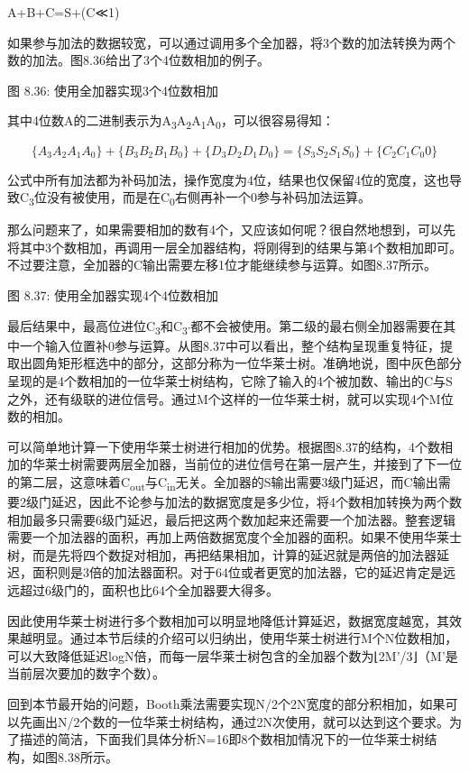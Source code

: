 \documentclass[]{ctexbook}
\begin{document}
A+B+C=S+(C≪1)

如果参与加法的数据较宽，可以通过调用多个全加器，将3个数的加法转换为两个数的加法。图8.36给出了3个4位数相加的例子。

图 8.36: 使用全加器实现3个4位数相加

其中4位数A的二进制表示为A\textsubscript{3}A\textsubscript{2}A\textsubscript{1}A\textsubscript{0}，可以很容易得知：

\[\{A_{3}A_{2}A_{1}A_{0}\}+\{B_{3}B_{2}B_{1}B_{0}\}+\{D_{3}D_{2}D_{1}D_{0}\}=\{S_{3}S_{2}S_{1}S_{0}\}+\{C_{2}C_{1}C_{0}0\}\]

公式中所有加法都为补码加法，操作宽度为4位，结果也仅保留4位的宽度，这也导致C\textsubscript{3}位没有被使用，而是在C\textsubscript{0}右侧再补一个0参与补码加法运算。

那么问题来了，如果需要相加的数有4个，又应该如何呢？很自然地想到，可以先将其中3个数相加，再调用一层全加器结构，将刚得到的结果与第4个数相加即可。不过要注意，全加器的C输出需要左移1位才能继续参与运算。如图8.37所示。

图 8.37: 使用全加器实现4个4位数相加

最后结果中，最高位进位C\textsubscript{3}和C\textsubscript{3'}都不会被使用。第二级的最右侧全加器需要在其中一个输入位置补0参与运算。从图8.37中可以看出，整个结构呈现重复特征，提取出圆角矩形框选中的部分，这部分称为一位华莱士树。准确地说，图中灰色部分呈现的是4个数相加的一位华莱士树结构，它除了输入的4个被加数、输出的C与S之外，还有级联的进位信号。通过M个这样的一位华莱士树，就可以实现4个M位数的相加。

可以简单地计算一下使用华莱士树进行相加的优势。根据图8.37的结构，4个数相加的华莱士树需要两层全加器，当前位的进位信号在第一层产生，并接到了下一位的第二层，这意味着C\textsubscript{out}与C\textsubscript{in}无关。全加器的S输出需要3级门延迟，而C输出需要2级门延迟，因此不论参与加法的数据宽度是多少位，将4个数相加转换为两个数相加最多只需要6级门延迟，最后把这两个数加起来还需要一个加法器。整套逻辑需要一个加法器的面积，再加上两倍数据宽度个全加器的面积。如果不使用华莱士树，而是先将四个数捉对相加，再把结果相加，计算的延迟就是两倍的加法器延迟，面积则是3倍的加法器面积。对于64位或者更宽的加法器，它的延迟肯定是远远超过6级门的，面积也比64个全加器要大得多。

因此使用华莱士树进行多个数相加可以明显地降低计算延迟，数据宽度越宽，其效果越明显。通过本节后续的介绍可以归纳出，使用华莱士树进行M个N位数相加，可以大致降低延迟logN倍，而每一层华莱士树包含的全加器个数为⌊2M'/3⌋（M'是当前层次要加的数字个数）。

回到本节最开始的问题，Booth乘法需要实现N/2个2N宽度的部分积相加，如果可以先画出N/2个数的一位华莱士树结构，通过2N次使用，就可以达到这个要求。为了描述的简洁，下面我们具体分析N=16即8个数相加情况下的一位华莱士树结构，如图8.38所示。
\end{document}
